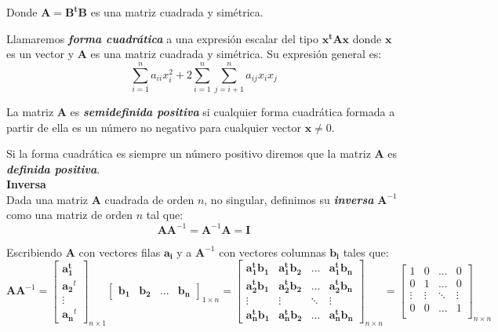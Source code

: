 \documentclass[12pt,letterpaper]{report} %
\begin{document}
Donde $\mathbf{A}=\mathbf{B^tB}$ es una matriz cuadrada y simétrica.

Llamaremos \textit{\textbf{forma cuadrática}} a una expresión escalar del tipo $\mathbf{x^t\mathbf{A}x}$ donde $\mathbf{x}$ es un vector y $\mathbf{A}$ es una matriz cuadrada y simétrica. Su expresión general es:
$$\sum_{i=1}^{n} a_{ii}x_{i}^2 + 2\sum_{i=1}^{n}\sum_{j=i+1}^{n}a_{ij}x_{i}x_{j}$$

La matriz $\mathbf{A}$ es \textit{\textbf{semidefinida positiva}} si cualquier forma cuadrática formada a partir de ella es un número no negativo para cualquier vector $\mathbf{x}\ne 0$.

Si la forma cuadrática es siempre un número positivo diremos que la matriz $\mathbf{A}$ es \textit{\textbf{definida positiva}}. \\

\textbf{Inversa}
\\

Dada una matriz $\mathbf{A}$ cuadrada de orden $n$, no singular, definimos su \textit{\textbf{inversa}} $\mathbf{A}^{-1}$ como una matriz de orden $n$ tal que:
$$\mathbf{A}\mathbf{A}^{-1}=\mathbf{A}^{-1}\mathbf{A}= \mathbf{I}$$

Escribiendo $\mathbf{A}$ con vectores filas $\mathbf{a_{i}}$ y a $\mathbf{A}^{-1}$ con vectores columnas $\mathbf{b_{i}}$ tales que:
$$
\mathbf{A}\mathbf{A}^{-1}=\begin{bmatrix} \mathbf{a_{1}^t}\\ \mathbf{a_{2}}^t \\ \vdots \\ \mathbf{a_{n}}^t\end{bmatrix}_{n\times 1} \begin{bmatrix} \mathbf{b_{1}} & \mathbf{b_{2}} & ... & \mathbf{b_{n}} \end{bmatrix}_{1\times n}= \begin{bmatrix} \mathbf{a_{1}^tb_{1}} & \mathbf{a_{1}^tb_{2}} & ... & \mathbf{a_{1}^tb_{n}}\\  \mathbf{a_{2}^tb_{1}} & \mathbf{a_{2}^tb_{2}} & ... & \mathbf{a_{2}^tb_{n}} \\ \vdots & \vdots & \ddots & \vdots \\  \mathbf{a_{n}^tb_{1}} & \mathbf{a_{n}^tb_{2}} & ... & \mathbf{a_{n}^tb_{n}}  \end{bmatrix}_{n\times n}=
\begin{bmatrix}
1 & 0 & ... & 0 \\
0 & 1 & ... & 0 \\
\vdots   & \vdots &  \ddots & \vdots \\
0 & 0 & ... & 1 \\
\end{bmatrix}_{n\times n}
$$
\end{document}
